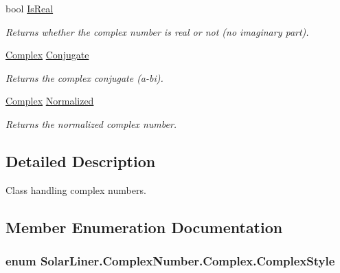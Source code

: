 \begin{DoxyCompactItemize}
bool \hyperlink{struct_solar_liner_1_1_complex_number_1_1_complex_aea768996f77db530fbf4eeedb5395d1d}{Is\+Real}
\begin{DoxyCompactList}\small\item\em Returns whether the complex number is real or not (no imaginary part). \end{DoxyCompactList}\item 
\hyperlink{struct_solar_liner_1_1_complex_number_1_1_complex}{Complex} \hyperlink{struct_solar_liner_1_1_complex_number_1_1_complex_a17a3e752294b9155259c017f85dc029c}{Conjugate}
\begin{DoxyCompactList}\small\item\em Returns the complex conjugate (a-\/bi). \end{DoxyCompactList}\item 
\hyperlink{struct_solar_liner_1_1_complex_number_1_1_complex}{Complex} \hyperlink{struct_solar_liner_1_1_complex_number_1_1_complex_a1aee91d60a830dd7c455e85a3976b622}{Normalized}
\begin{DoxyCompactList}\small\item\em Returns the normalized complex number. \end{DoxyCompactList}\end{DoxyCompactItemize}


\subsection{Detailed Description}
Class handling complex numbers. 



\subsection{Member Enumeration Documentation}
\subsubsection[{\texorpdfstring{Complex\+Style}{ComplexStyle}}]{\setlength{\rightskip}{0pt plus 5cm}enum {\bf Solar\+Liner.\+Complex\+Number.\+Complex.\+Complex\+Style}\hspace{0.3cm}{\ttfamily [strong]}}\hypertarget{struct_solar_liner_1_1_complex_number_1_1_complex_af40acfb18b45366e7f1e66f752b8dc7d}{}\label{struct_solar_liner_1_1_complex_number_1_1_complex_af40acfb18b45366e7f1e66f752b8dc7d}


